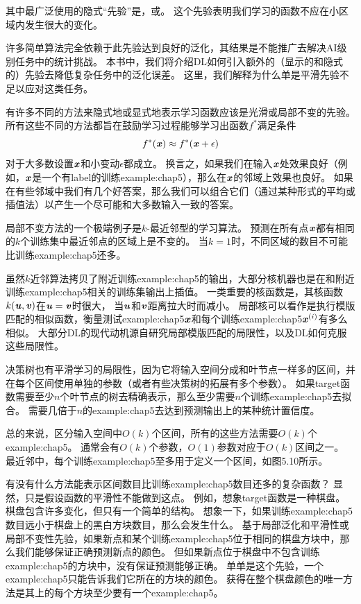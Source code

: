 
其中最广泛使用的隐式``先验''是，或。
这个先验表明我们学习的函数不应在小区域内发生很大的变化。

许多简单算法完全依赖于此先验达到良好的泛化，其结果是不能推广去解决\gls{AI}级别任务中的统计挑战。
本书中，我们将介绍\gls{DL}如何引入额外的（显示的和隐式的）先验去降低复杂任务中的泛化误差。
这里，我们解释为什么单是平滑先验不足以应对这类任务。

有许多不同的方法来隐式地或显式地表示学习函数应该是光滑或局部不变的先验。
所有这些不同的方法都旨在鼓励学习过程能够学习出函数$f^*$满足条件
\begin{equation}
    f^*(\boldsymbol{\mathit{x}}) \approx f^*(\boldsymbol{\mathit{x}} + \epsilon)
\end{equation}
对于大多数设置$\boldsymbol{\mathit{x}}$和小变动$\epsilon$都成立。
换言之，如果我们在输入$\boldsymbol{\mathit{x}}$处效果良好（例如，$\boldsymbol{\mathit{x}}$是一个有\gls{label}的训练\gls{example:chap5}），那么在$\boldsymbol{\mathit{x}}$的邻域上效果也良好。
如果在有些邻域中我们有几个好答案，那么我们可以组合它们（通过某种形式的平均或插值法）以产生一个尽可能和大多数输入一致的答案。

局部不变方法的一个极端例子是$k$-最近邻型的学习算法。
预测在所有点$\boldsymbol{\mathit{x}}$都有相同的$k$个训练集中最近邻点的区域上是不变的。
当$k=1$时，不同区域的数目不可能比训练\gls{example:chap5}还多。

虽然$k$近邻算法拷贝了附近训练\gls{example:chap5}的输出，大部分核机器也是在和附近训练\gls{example:chap5}相关的训练集输出上插值。
一类重要的核函数是，其核函数$k(\boldsymbol{\mathit{u}},\boldsymbol{\mathit{v}})$在$\boldsymbol{\mathit{u}}=\boldsymbol{\mathit{v}}$时很大，
当$\boldsymbol{\mathit{u}}$和$\boldsymbol{\mathit{v}}$距离拉大时而减小。
局部核可以看作是执行模版匹配的相似函数，衡量测试\gls{example:chap5}$\boldsymbol{\mathit{x}}$和每个训练\gls{example:chap5}$\boldsymbol{\mathit{x}}^{(i)}$有多么相似。
大部分\gls{DL}的现代动机源自研究局部模版匹配的局限性，以及\gls{DL}如何克服这些局限性\citep{NIPS2005_424}。

决策树也有平滑学习的局限性，因为它将输入空间分成和叶节点一样多的区间，并在每个区间使用单独的参数（或者有些决策树的拓展有多个参数）。
如果\gls{target}函数需要至少$n$个叶节点的树去精确表示，那么至少需要$n$个训练\gls{example:chap5}去拟合。
需要几倍于$n$的\gls{example:chap5}去达到预测输出上的某种统计置信度。


总的来说，区分输入空间中$O(k)$个区间，所有的这些方法需要$O(k)$个\gls{example:chap5}。
通常会有$O(k)$个参数，$O(1)$参数对应于$O(k)$区间之一。
最近邻中，每个训练\gls{example:chap5}至多用于定义一个区间，如图5.10所示。

有没有什么方法能表示区间数目比训练\gls{example:chap5}数目还多的复杂函数？
显然，只是假设函数的平滑性不能做到这点。
例如，想象\gls{target}函数是一种棋盘。
棋盘包含许多变化，但只有一个简单的结构。
想象一下，如果训练\gls{example:chap5}数目远小于棋盘上的黑白方块数目，那么会发生什么。
基于局部泛化和平滑性或局部不变性先验，如果新点和某个训练\gls{example:chap5}位于相同的棋盘方块中，那么我们能够保证正确预测新点的颜色。
但如果新点位于棋盘中不包含训练\gls{example:chap5}的方块中，没有保证预测能够正确。
单单是这个先验，一个\gls{example:chap5}只能告诉我们它所在的方块的颜色。
获得在整个棋盘颜色的唯一方法是其上的每个方块至少要有一个\gls{example:chap5}。

